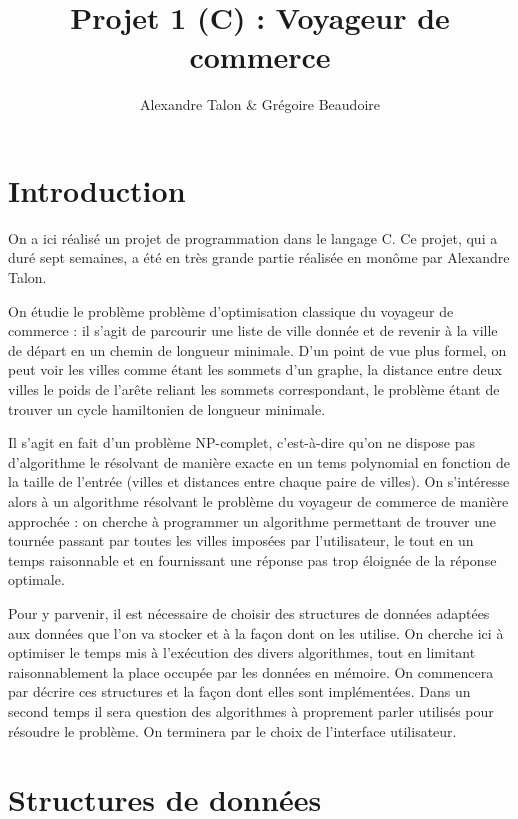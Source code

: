 \documentclass{article}
\title{Projet 1 (C) : Voyageur de commerce}
\author{Alexandre Talon \& Grégoire Beaudoire}
\begin{document}
\maketitle
\tableofcontents
\section*{Introduction}
On a ici réalisé un projet de programmation dans le langage C. Ce projet, qui a duré sept semaines, a été en très grande partie réalisée en monôme par Alexandre Talon.

On étudie le problème problème d'optimisation classique du voyageur de commerce : il s'agit de parcourir une liste de ville donnée et de revenir à la ville de départ
en un chemin de longueur minimale. D'un point de vue plus formel, on peut voir les villes comme étant les sommets d'un graphe, la distance entre deux villes le poids de 
l'arête reliant les sommets correspondant, le problème étant de trouver un cycle hamiltonien de longueur minimale.


Il s'agit en fait d'un problème NP-complet, c'est-à-dire qu'on ne dispose pas d'algorithme le résolvant de manière exacte en un tems polynomial en fonction de la taille
de l'entrée (villes et distances entre chaque paire de villes). On s'intéresse alors à un algorithme résolvant le problème du voyageur de commerce de manière approchée :
on cherche à programmer un algorithme permettant de trouver une tournée passant par toutes les villes imposées par l'utilisateur, le tout en un temps raisonnable et en
fournissant une réponse pas trop éloignée de la réponse optimale.


Pour y parvenir, il est nécessaire de choisir des structures de données adaptées aux données que l'on va stocker et à la façon dont on les utilise. On cherche
ici à optimiser le temps mis à l'exécution des divers algorithmes, tout en limitant raisonnablement la place occupée par les données en mémoire. On commencera par
décrire ces structures et la façon dont elles sont implémentées. Dans un second temps il sera question des algorithmes à proprement parler utilisés pour résoudre
le problème. On terminera par le choix de l'interface utilisateur.

\section{Structures de données}
\end{document}
